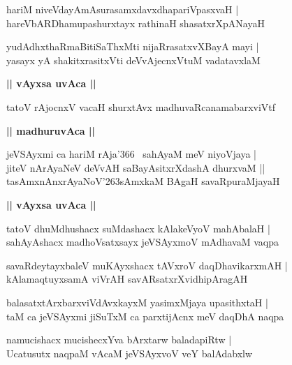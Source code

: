 \documentclass[twoside,12pt,openright]{book}
\def\S{\char'263}
\newcounter{shloka}[chapter]
\def\uvaca#1{\centerline{{\large\textbf{#1}}}}
\begin{document}
\begin{shloka}%
hariM niveVdayAmAsurasamxdavxdhapariVpasxvaH |\\
hareVbARDhamupashurxtayx rathinaH shasatxrXpANayaH 
\end{shloka}

\begin{shloka}%
yudAdhxthaRmaBitiSaThxMti nijaRrasatxvXBayA mayi |\\
yasayx yA shakitxrasitxVti deVvAjecnxVtuM vadatavxlaM 
\end{shloka}

\uvaca{|| vAyxsa uvAca ||}

\begin{shloka}%
tatoV rAjocnxV vacaH shurxtAvx madhuvaRcanamabarxviVtf
\end{shloka}

\uvaca{|| madhuruvAca ||}

\begin{shloka}%
jeVSAyxmi ca hariM rAja\char'366 ~sahAyaM meV niyoVjaya |\\
jiteV nArAyaNeV deVvAH saBayAsitxrXdashA dhurxvaM ||\\
tasAmxnAnxrAyaNoV\S sAmxkaM BAgaH savaRpuraMjayaH 
\end{shloka}

\uvaca{|| vAyxsa uvAca ||}

\begin{shloka}%
tatoV dhuMdhushacx suMdashacx kAlakeVyoV mahAbalaH |\\
sahAyAshacx madhoVsatxsayx jeVSAyxmoV mAdhavaM vaqpa
\end{shloka}

\begin{shloka}%
savaRdeytayxbaleV muKAyxshacx tAVxroV daqDhavikarxmAH |\\
kAlamaqtuyxsamA viVrAH savARsatxrXvidhipAragAH 
\end{shloka}

\begin{shloka}%
balasatxtArxbarxviVdAvxkayxM yasimxMjaya upasithxtaH |\\
taM ca jeVSAyxmi jiSuTxM ca parxtijAcnx meV daqDhA naqpa
\end{shloka}

\begin{shloka}%
namucishacx mucishecxYva bArxtarw baladapiRtw |\\
Ucatusutx naqpaM vAcaM jeVSAyxvoV veY balAdabxlw 
\end{shloka}
\end{document}
